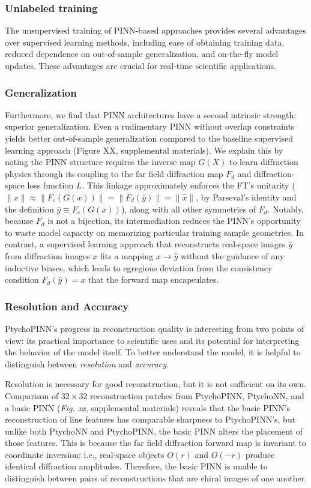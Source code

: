 \documentclass[sn-mathphys]{sn-jnl}%
\theoremstyle{thmstyleone}%
\theoremstyle{thmstyletwo}%
\theoremstyle{thmstylethree}%
\begin{document}
\subsubsection{Unlabeled training}
The unsupervised training of PINN-based approaches provides several advantages over supervised learning methods, including ease of obtaining training data, reduced dependence on out-of-sample generalization, and on-the-fly model updates. These advantages are crucial for real-time scientific applications.

\subsubsection{Generalization}
Furthermore, we find that PINN architectures have a second intrinsic strength: superior generalization. Even a rudimentary PINN without overlap constraints yields better out-of-sample generalization compared to the baseline supervised learning approach (Figure XX, supplemental materials). We explain this by noting the PINN structure requires the inverse map $G(X)$ to learn diffraction physics through its coupling to the far field diffraction map $F_d$ and diffraction-space loss function $L$. This linkage approximately enforces the FT's unitarity ($\lVert x \rVert \approx \lVert F_c(G(x)) \rVert = \lVert F_d(\bar{y}) \rVert = \lVert \hat{x} \rVert$, by Parseval's identity and the definition $\bar{y} \equiv F_c(G(x))$), along with all other symmetries of $F_d$. Notably, because $F_d$ is not a bijection, its intermediation reduces the PINN's opportunity to waste model capacity on memorizing particular training sample geometries. In contrast, a supervised learning approach that reconstructs real-space images $\hat{y}$ from diffraction images $x$ fits a mapping $x \rightarrow \hat{y}$  without the guidance of any inductive biases, which leads to egregious deviation from the consistency condition $F_d(\bar{y}) = x$ that the forward map encapsulates. 

\subsubsection{Resolution and Accuracy}
PtychoPINN's progress in reconstruction quality is interesting from two points of view: its practical importance to scientific uses and its potential for interpreting the behavior of the model itself. To better understand the model, it is helpful to distinguish between \emph{resolution} and \emph{accuracy}.

Resolution is necessary for good reconstruction, but it is not sufficient on its own. Comparison of $32 \times 32$ reconstruction patches from PtychoPINN, PtychoNN, and a basic PINN (\emph{Fig. xx}, supplemental materials) reveals that the basic PINN's reconstruction of line features has comparable sharpness to PtychoPINN's, but unlike both PtychoNN and PtychoPINN, the basic PINN alters the placement of those features. This is because the far field diffraction forward map is invariant to coordinate inversion: i.e., real-space objects $O(r)$ and $O(-r)$ produce identical diffraction amplitudes. Therefore, the basic PINN is unable to distinguish between pairs of reconstructions that are chiral images of one another.
\end{document}
